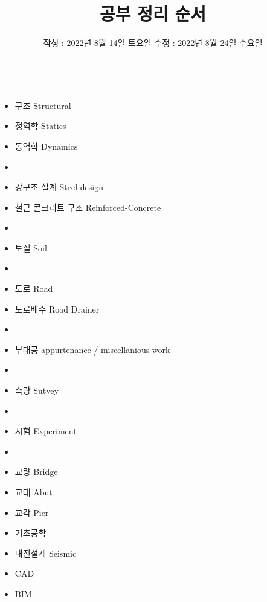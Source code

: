 \documentclass[	25pt, 
							a1paper, 
							landscape,
							margin=0mm, %
							innermargin=10mm,  		%
							blockverticalspace=4mm, %
							colspace=5mm, 
							subcolspace=0mm
							]{tikzposter}
\title{공부 정리 순서 }
\author{ 		작성 : 2022년 8월 14일 토요일  	수정 : 2022년 8월 24일 수요일 }
\begin{document}
	\maketitle[
					width=841mm,
					linewidth = 2mm,
					innersep=4mm,
					titletotopverticalspace=2mm, %
					titletoblockverticalspace=2mm, %
					titletextscale =4, 
				]


	\begin{columns}


			{
					\begin{itemize}
					\item 구조    Structural
					\item 정역학 Statics
					\item 동역학  Dynamics
					\item 
					\item 강구조 설계           Steel-design
					\item 철근 콘크리트 구조 Reinforced-Concrete
					\item
					\item 토질        Soil
					\item 
					\item 도로        Road
					\item 도로배수  Road Drainer
					\item 
					\item 부대공   appurtenance / miscellanious work
					\item 
					\item 측량  Sutvey 
					\item 
					\item 시험   Experiment
					\item 
					\item 교량   Bridge
					\item 교대   Abut
					\item 교각   Pier
					\item 기초공학
					\item 내진설계 Seismic
					\item CAD
					\item BIM
					\end{itemize}
			} %





\end{columns}
\end{document}
